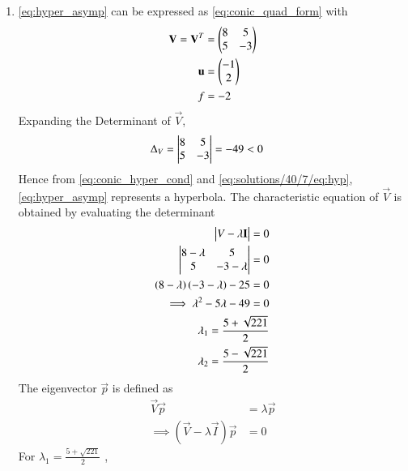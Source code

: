 \begin{enumerate}
\item  \eqref{eq:hyper_asymp} can be expressed as \eqref{eq:conic_quad_form} with 
\begin{align}
    \mathbf{V}=\mathbf{V}^T&=\begin{pmatrix}8 & 5 \\ 5 &-3\end{pmatrix}\label{eq:solutions/40/7/eqv}\\
    \mathbf{u}&=\begin{pmatrix}-1 \\2 \end{pmatrix}\label{eq:solutions/40/7/equ}\\
    f&=-2\label{eq:solutions/40/7/eqfv}
\end{align}   
Expanding the Determinant of $\vec{V}$,
\begin{align}
    \Delta_{V} &= \begin{vmatrix}
8 &5
\\
5 & -3
\end{vmatrix}
= -49 < 0
\label{eq:solutions/40/7/eq:hyp}
\end{align}
Hence from \eqref{eq:conic_hyper_cond} and \eqref{eq:solutions/40/7/eq:hyp}, \eqref{eq:hyper_asymp}
represents a hyperbola.
The characteristic equation of $\vec{V}$ is obtained by evaluating the determinant 
\begin{align}
\begin{vmatrix}V-\lambda\mathbf{I}\end{vmatrix} = 0
\\
\begin{vmatrix}
8-\lambda & 5 \\ 5 & -3-\lambda
\end{vmatrix} = 0
\\
    \left(8-\lambda\right)\left(-3-\lambda\right)-25=0\\
\implies \lambda^2 -5\lambda -49 = 0
\label{eq:asymptotes_char}
\\
    \lambda_{1}= \frac{5+\sqrt{221}}{2}\label{eq:solutions/40/7/eq:matrix_l1}\\
    \lambda_{2}= \frac{5-\sqrt{221}}{2}\label{eq:solutions/40/7/eq:matrix_l2}
\end{align}
The eigenvector $\vec{p}$ is defined as 
\begin{align}
    \vec{V}\vec{p}&=\lambda\vec{p}\\
    \implies (\vec{V}-\lambda\vec{I})\vec{p}&=0\label{eq:solutions/40/7/eq:7/eqev}
\end{align}
For $\lambda_1=\frac{5+\sqrt{221}}{2}$ ,

\end{enumerate}
